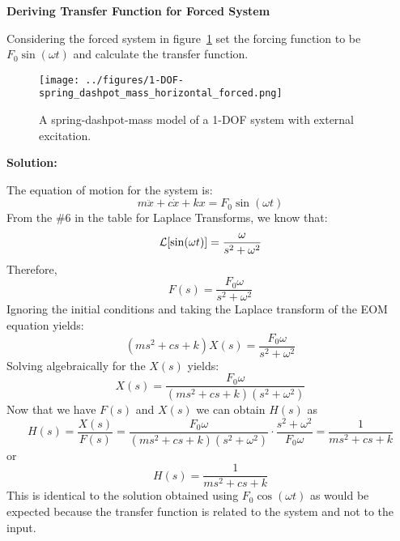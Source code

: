 \documentclass[12pt,letter]{article}
\begin{document}
\begin{example}


	\noindent\textbf{Deriving Transfer Function for Forced System}

	\noindent Considering the forced system in figure~\ref{fig:1-DOF-spring_dashpot_mass_horizontal_forced}	set the forcing function to be $F_0 \sin(\omega t)$ and calculate the transfer function.  \\
	\begin{figure}[H]
		\centering
		\texttt{[image: ../figures/1-DOF-spring\_dashpot\_mass\_horizontal\_forced.png]}
		\vspace{-2ex}
		\caption{A spring-dashpot-mass model of a 1-DOF system with external excitation.}
		\label{fig:1-DOF-spring_dashpot_mass_horizontal_forced}
	\end{figure}

			\vspace{-2ex}	
	\noindent\textbf{Solution:}

	\noindent The equation of motion for the system is:
	\begin{equation}
		m\ddot{x} + c\dot{x} +kx = F_0 \sin(\omega t)
	\end{equation}
	From the \#6 in the table for Laplace Transforms, we know that:
	\begin{equation}
		\mathcal{L}{\left[\sin(\omega t)\right]} = \frac{\omega}{s^2+\omega^2}
	\end{equation}
	Therefore, 
	\begin{equation}
	F(s) = \frac{F_0\omega}{s^2+\omega^2}
	\end{equation}
	Ignoring the initial conditions and taking the Laplace transform of the EOM equation yields:
	\begin{equation}
	(ms^2 + cs +k)X(s) = \frac{F_0 \omega}{s^2+\omega^2} 
	\end{equation}
	Solving algebraically for the $X(s)$ yields: 
	\begin{equation}
	X(s) = \frac{F_0\omega}{(ms^2 + cs +k)(s^2+\omega^2)}
	\end{equation}
	Now that we have $F(s)$ and $X(s)$ we can obtain $H(s)$ as  
	\begin{equation}
	H(s) = \frac{X(s)}{F(s)} = \frac{F_0 \omega }{(ms^2 + cs +k)(s^2+\omega^2)} \cdot \frac{s^2+\omega^2}{F_0 \omega} = \frac{1}{ms^2+cs+k}
	\end{equation}
	or 
	\begin{equation}
	H(s) = \frac{1}{ms^2+cs+k}
	\end{equation}
	This is identical to the solution obtained using $F_0 \cos(\omega t)$ as would be expected because the transfer function is related to the system and not to the input. 
\end{example}  
\end{document}
